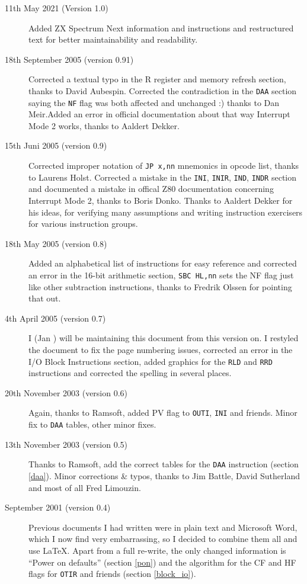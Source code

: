 \documentclass[12pt,twoside,openright,a4paper]{book}
\begin{document}
\begin{description}

	\item[11th May 2021 (Version 1.0)]
	Added ZX Spectrum Next information and instructions and restructured text for better maintainability and readability.

	\item[18th September 2005 (version 0.91)]
	Corrected a textual typo in the R register and memory refresh section, thanks to David Aubespin. Corrected the contradiction in the {\tt DAA} section saying the {\tt NF} flag was both affected and unchanged :) thanks to Dan Meir.Added an error in official documentation about that way Interrupt Mode 2 works, thanks to Aaldert Dekker.
	
	\item[15th Juni 2005 (version 0.9)]
	Corrected improper notation of {\tt JP x,nn} mnemonics in opcode list, thanks to Laurens Holst. Corrected a mistake in the {\tt INI}, {\tt INIR}, {\tt IND}, {\tt INDR} section and documented a mistake in offical Z80 documentation concerning Interrupt Mode 2, thanks to Boris Donko. Thanks to Aaldert Dekker for his ideas, for verifying many assumptions and writing instruction exercisers for various instruction groups.

	\item[18th May 2005 (version 0.8)]
	Added an alphabetical list of instructions for easy reference and corrected an error in the 16-bit arithmetic section, {\tt SBC HL,nn} sets the NF flag just like other subtraction instructions, thanks to Fredrik Olssen for pointing that out.

	\item[4th April 2005 (version 0.7)]
	I (Jan ) will be maintaining this document from this version on. I restyled the document to fix the page numbering issues, corrected an error in the I/O Block Instructions section, added graphics for the {\tt RLD} and {\tt RRD} instructions and corrected the spelling in several places.

	\item[20th November 2003 (version 0.6)]
	Again, thanks to Ramsoft, added PV flag to {\tt OUTI}, {\tt INI} and friends. Minor fix to {\tt DAA} tables, other minor fixes.

	\item[13th November 2003 (version 0.5)]
	Thanks to Ramsoft, add the correct tables for the {\tt DAA} instruction (section \ref{daa}). Minor corrections \& typos, thanks to Jim Battle, David Sutherland and most of all Fred Limouzin.

	\item[September 2001 (version 0.4)]
	Previous documents I had written were in plain text and Microsoft Word, which I now find very embarrassing, so I decided to combine them all and use {\LaTeX}. Apart from a full re-write, the only changed information is ``Power on defaults'' (section \ref{pon}) and the algorithm for the CF and HF flags for {\tt OTIR} and friends (section \ref{block_io}).

\end{description}
\end{document}
